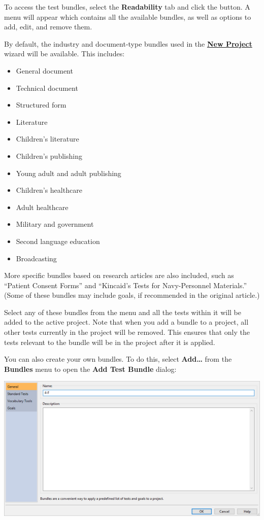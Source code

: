 \documentclass[
]{book}
\providecommand{\tightlist}{%
  \setlength{\itemsep}{0pt}\setlength{\parskip}{0pt}}
\theoremstyle{definition}
\theoremstyle{definition}
\theoremstyle{definition}
\theoremstyle{definition}
\theoremstyle{remark}
\begin{document}
To access the test bundles, select the \textbf{Readability} tab and click the  button. A menu will appear which contains all the available bundles, as well as options to add, edit, and remove them.

\begin{minipage}{\textwidth}

By default, the industry and document-type bundles used in the \protect\hyperlink{creating-standard-project}{\textbf{New Project}} wizard will be available. This includes:

\begin{itemize}
\tightlist
\item
  General document
\item
  Technical document
\item
  Structured form
\item
  Literature
\item
  Children's literature
\item
  Children's publishing
\item
  Young adult and adult publishing
\item
  Children's healthcare
\item
  Adult healthcare
\item
  Military and government
\item
  Second language education
\item
  Broadcasting
\end{itemize}

\end{minipage}

More specific bundles based on research articles are also included, such as ``Patient Consent Forms'' and ``Kincaid's Tests for Navy-Personnel Materials.'' (Some of these bundles may include goals, if recommended in the original article.)

Select any of these bundles from the menu and all the tests within it will be added to the active project. Note that when you add a bundle to a project, all other tests currently in the project will be removed. This ensures that only the tests relevant to the bundle will be in the project after it is applied.

You can also create your own bundles. To do this, select \textbf{Add\ldots{}} from the \textbf{Bundles} menu to open the \textbf{Add Test Bundle} dialog:

\includegraphics{Images/TestBundle.png}
\end{document}
